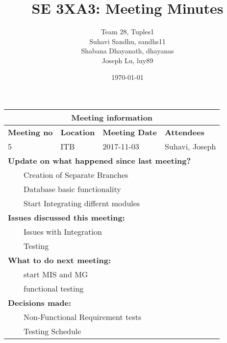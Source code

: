 \documentclass{article}
\title{SE 3XA3: Meeting Minutes}
\author{Team 28, Tuples1
		\\ Suhavi Sandhu, sandhs11
		\\ Shabana Dhayanath, dhayanas
		\\ Joseph Lu, luy89
}
\date{\today}
\newcommand{\tabitem}{~~\llap{\textbullet}~~}
\begin{document}
\begin{tabularx}{\textwidth}{| X || X || X || X |}

    \hline
    \hline
    \multicolumn{4}{|c|}{\textbf{Meeting information}}\\
    \hline
    \hline
        
    \textbf{Meeting no}& \textbf{Location}&\textbf{Meeting Date}&\textbf{Attendees}\\
    
    \hline

    5 & ITB & 2017-11-03 & Suhavi, Joseph\\
    
    \hline

    \multicolumn{4}{|l|}{\textbf{Update on what happened since last meeting?}}\\

    \multicolumn{4}{|l|}{\tabitem Creation of Separate Branches}\\
    \multicolumn{4}{|l|}{\tabitem Database basic functionality}\\
    \multicolumn{4}{|l|}{\tabitem Start Integrating differnt modules}\\

    \hline

    \multicolumn{4}{|l|}{\textbf{Issues discussed this meeting:}}\\
    
    \multicolumn{4}{|l|}{\tabitem Issues with Integration}\\
    \multicolumn{4}{|l|}{\tabitem Testing}\\

    \hline

    \multicolumn{4}{|l|}{\textbf{What to do next meeting:}}\\

    \multicolumn{4}{|l|}{\tabitem start MIS and MG}\\
    \multicolumn{4}{|l|}{\tabitem functional testing}\\

    \hline

    \multicolumn{4}{|l|}{\textbf{Decisions made:}}\\
    
    \multicolumn{4}{|l|}{\tabitem Non-Functional Requirement tests}\\
    \multicolumn{4}{|l|}{\tabitem Testing Schedule}\\

    \hline


\end{tabularx}
\end{document}
